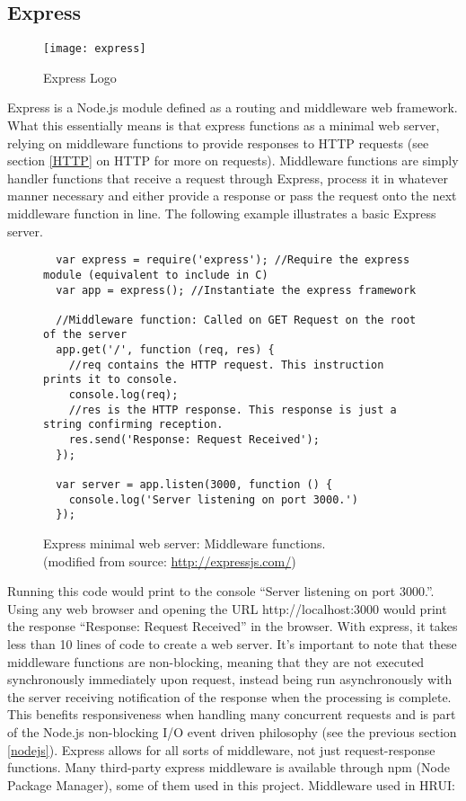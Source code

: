 \subsection{Express}
\begin{figure}[H]
  \begin{center}
    \texttt{[image: express]}
  \end{center}
  \caption{Express Logo}
\end{figure}
Express is a Node.js module defined as a routing and middleware web framework. What this essentially means is that express functions as a minimal web server, relying on middleware functions to provide responses to HTTP requests (see section \ref{HTTP} on HTTP for more on requests). Middleware functions are simply handler functions that receive a request through Express, process it in whatever manner necessary and either provide a response or pass the request onto the next middleware function in line. The following example illustrates a basic Express server.
\begin{figure}[H]
  \centering
  \captionsetup{justification=centering}
  \begin{verbatim}
  var express = require('express'); //Require the express module (equivalent to include in C)
  var app = express(); //Instantiate the express framework 

  //Middleware function: Called on GET Request on the root of the server
  app.get('/', function (req, res) {
    //req contains the HTTP request. This instruction prints it to console.
    console.log(req);
    //res is the HTTP response. This response is just a string confirming reception.
    res.send('Response: Request Received');
  });

  var server = app.listen(3000, function () {
    console.log('Server listening on port 3000.')
  });
  \end{verbatim}
  \caption{Express minimal web server: Middleware functions.\\(modified from source: \url{http://expressjs.com/})}
\end{figure}
Running this code would print to the console ``Server listening on port 3000.''. Using any web browser and opening the URL http://localhost:3000 would print the response ``Response: Request Received'' in the browser. With express, it takes less than 10 lines of code to create a web server. It's important to note that these middleware functions are non-blocking, meaning that they are not executed synchronously immediately upon request, instead being run asynchronously with the server receiving notification of the response when the processing is complete. This benefits responsiveness when handling many concurrent requests and is part of the Node.js non-blocking I/O event driven philosophy (see the previous section \ref{nodejs}). Express allows for all sorts of middleware, not just request-response functions. Many third-party express middleware is available through npm (Node Package Manager), some of them used in this project. Middleware used in HRUI:
